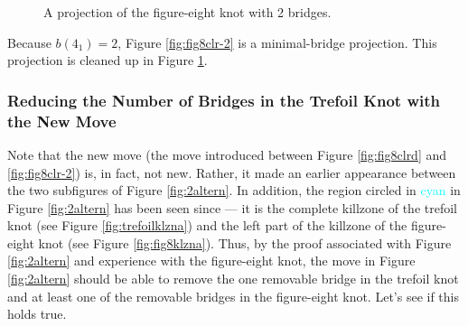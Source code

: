 \documentclass[titlepage]{article}
\begin{document}
\begin{figure}[h!]
    \centering
    \caption{A projection of the figure-eight knot with 2 bridges.}
    \label{fig:fig8fin}
\end{figure}

Because $b(4_1)=2$, Figure \ref{fig:fig8clr-2} is a minimal-bridge projection. This projection is cleaned up in Figure \ref{fig:fig8fin}.


\subsubsection{Reducing the Number of Bridges in the Trefoil Knot with the New Move}\label{ss2:trefoilreduce-2}
Note that the new move (the move introduced between Figure \ref{fig:fig8clrd} and \ref{fig:fig8clr-2}) is, in fact, not new. Rather, it made an earlier appearance between the two subfigures of Figure \ref{fig:2altern}. In addition, the region circled in \textcolor{cyan}{cyan} in Figure \ref{fig:2altern} has been seen since --- it is the complete killzone of the trefoil knot (see Figure \ref{fig:trefoilklzna}) and the left part of the killzone of the figure-eight knot (see Figure \ref{fig:fig8klzna}). Thus, by the proof associated with Figure \ref{fig:2altern} and experience with the figure-eight knot, the move in Figure \ref{fig:2altern} should be able to remove the one removable bridge in the trefoil knot and at least one of the removable bridges in the figure-eight knot. Let's see if this holds true.\par
\end{document}
